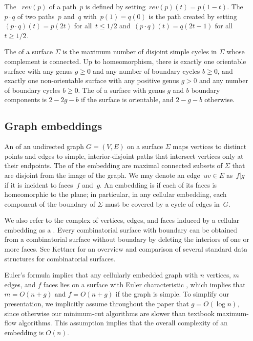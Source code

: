 \documentclass[letterpaper,review]{siamart190516}
\def\rev{\mathit{rev}}
\def\anote#1{\color{purple}Amir: #1 \color{black}}
\def\jnote#1{\textcolor{orange}{Jeff: #1}}
\begin{document}
The ~$\rev(p)$ of a path~$p$ is defined by
setting~$\rev(p)(t) = p(1-t)$. The ~$p \cdot q$ of two
paths~$p$ and~$q$ with~$p(1)=q(0)$ is the path created by
setting~$(p\cdot q)(t) = p(2t)$ for all~$t \leq 1/2$
and~$(p\cdot q)(t) = q(2t-1)$ for all~$t \geq 1/2$.

The  of a surface $\Sigma$ is the maximum number of disjoint simple cycles in $\Sigma$ whose complement is connected.
 Up to homeomorphism,
there is exactly one orientable surface with any genus $g\ge 0$ and any number of
boundary cycles $b\ge 0$, and exactly one non-orientable surface with any positive genus $g>0$ and any number of boundary cycles $b\ge 0$.
The  of a surface with genus $g$ and $b$ boundary components is ${2 - 2g - b}$ if the surface is orientable, and ${2 - g - b}$ otherwise.

\subsection{Graph embeddings}
\label{SS:embeddings}

An  of an undirected graph $G=(V,E)$ on a surface $\Sigma$ maps vertices to distinct points and edges to simple, interior-disjoint paths %
that intersect vertices only at their endpoints.
The  of the embedding are maximal connected subsets of $\Sigma$ that are disjoint from the image of the graph.
We may denote an edge~$uv \in E$ as~$f | g$ if it is incident to faces~$f$ and~$g$.
An embedding is  if each of its faces is homeomorphic to the plane; in particular, in any cellular embedding, each component of the boundary of $\Sigma$ must be covered by a cycle of edges in~$G$.  

We also refer to the complex of vertices, edges, and faces induced by a cellular embedding as a .  Every combinatorial surface with boundary can be obtained from a combinatorial surface without boundary by deleting the interiors of one or more faces.  See Kettner \cite{k-ugpdd-99} for an overview and comparison of several standard data structures for combinatorial surfaces. 

Euler's formula implies that any cellularly embedded graph with $n$ vertices, $m$ edges, and $f$ faces lies on a surface with Euler characteristic , which implies that $m = O(n+g)$ and $f=O(n+g)$ if the graph is simple.
To simplify our presentation, we implicitly assume throughout the paper that $g = O(\log n)$, since otherwise our minimum-cut algorithms are slower than textbook maximum-flow algorithms.  This assumption implies that the overall complexity of an embedding is $O(n)$.
\end{document}
